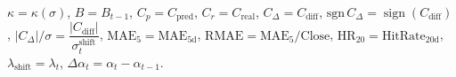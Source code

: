 \begin{threeparttable}
{\begin{tabular}{lrrrrrrrrrrrrr}
\bottomrule
\end{tabular}
}%
\begin{tablenotes}\footnotesize
\item $\kappa=\kappa(\sigma)$, $B=B_{t-1}$, $C_p=C_{\text{pred}}$, $C_r=C_{\text{real}}$, $C_\Delta=C_{\text{diff}}$, $\mathrm{sgn}\,C_\Delta=\operatorname{sign}(C_{\text{diff}})$, $|C_\Delta|/\sigma=\dfrac{|C_{\text{diff}}|}{\sigma_t^{\text{shift}}}$, $\mathrm{MAE}_5=\mathrm{MAE}_{5\text{d}}$, $\mathrm{RMAE}= \mathrm{MAE}_5 / \text{Close}$, $\mathrm{HR}_{20}=\mathrm{HitRate}_{20\text{d}}$, 
$\lambda_{\text{shift}}=\lambda_t$, 
$\Delta\alpha_t=\alpha_t-\alpha_{t-1}$.
\end{tablenotes}
\end{threeparttable}
\endgroup